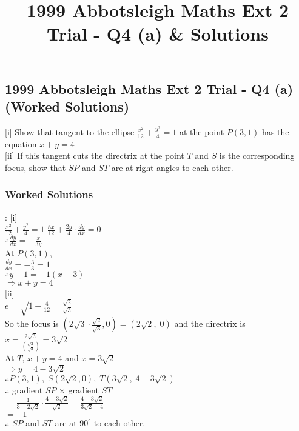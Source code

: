 \documentclass[10pt,a4paper]{report}
\title{1999 Abbotsleigh Maths Ext 2 Trial - Q4 (a) & Solutions}
\theoremstyle{thm}
\begin{document}
\subsection*{1999 Abbotsleigh Maths Ext 2 Trial - Q4 (a) (Worked Solutions)}
[i] Show that tangent to the ellipse $\displaystyle\frac{{{x^2}}}{{12}} + 
\frac{{{y^2}}}{4} = 1$ at the point $P\left( {3,1} \right)$ has the equation $x 
+ y = 4$\\[1em]
[ii] If this tangent cuts the directrix at the point $T$ and $S$ is the 
corresponding focus, show that $SP$ and $ST$ are at right angles to each 
other.\\
\subsubsection{Worked Solutions}:
[i]\\
$\displaystyle \frac{{{x^2}}}{{12}} + \frac{{{y^2}}}{4} = 1$
$\displaystyle \frac{{8x}}{{12}} + \frac{{2y}}{4} \cdot \frac{{dy}}{{dx}} = 0$\\
$\therefore \frac{{dy}}{{dx}} =  - \frac{x}{{3y}}$\\[1em]
At $P\left( {3,1} \right)$, \\
$\displaystyle \frac{{dy}}{{dx}} =  - \frac{3}{3} = 1$\\
$\therefore y - 1 =  - 1\left( {x - 3} \right)$\\
$ \Rightarrow x + y = 4$\\[1em]
[ii]\\
$e = \sqrt {1 - \frac{4}{{12}}}  = \frac{{\sqrt 2 }}{{\sqrt 3 }}$\\
So the focus is $\left( {2\sqrt 3  \cdot \frac{{\sqrt 2 }}{{\sqrt 3 }},0} \right) = \left( {2\sqrt 2 ,\;0} \right)$ and the directrix is $x = \displaystyle\frac{{2\sqrt 3 }}{{\left( {\frac{{\sqrt 2 }}{{\sqrt 3 }}} \right)}} = 3\sqrt 2 $\\[1em]
At $T$, $x + y = 4$ and $x = 3\sqrt 2 $\\
$ \Rightarrow y = 4 - 3\sqrt 2 $\\
$\therefore P\left( {3,1} \right),\;S\left( {2\sqrt 2 ,0} \right),\;T\left( {3\sqrt 2 ,\;4 - 3\sqrt 2 } \right)$\\[1em]
$\therefore $ gradient $SP$ $ \times $ gradient $ST$\\
$ = \displaystyle\frac{1}{{3 - 2\sqrt 2 }} \cdot \frac{{4 - 3\sqrt 2 }}{{\sqrt 2 }} = \frac{{4 - 3\sqrt 2 }}{{3\sqrt 2  - 4}}$\\
$ =  - 1$\\[1em]
$\therefore $ $SP$ and $ST$ are at $90^\circ $ to each other.\\
\end{document}
